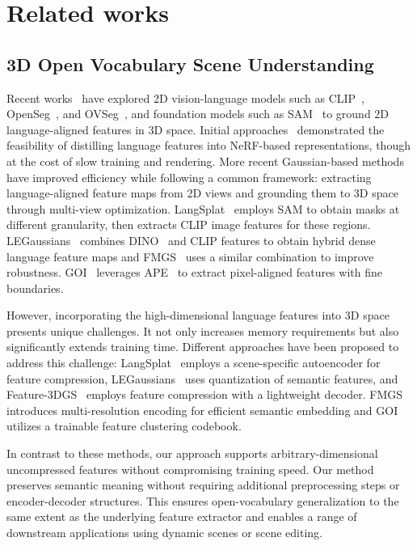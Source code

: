 \section{Related works}
\label{sec:related_works}

\subsection*{3D Open Vocabulary Scene Understanding} Recent works~\cite{zhang2023clip, chen2023clip2scene, peng2023openscene3dsceneunderstanding, tschernezki22neural, goel2023interactive} have explored 2D vision-language models such as CLIP~\cite{Radford2021LearningTV}, OpenSeg~\cite{ghiasi2022scaling}, and OVSeg~\cite{liang2023open}, and foundation models such as SAM~\cite{kirillov2023segment} to ground 2D language-aligned features in 3D space. Initial approaches~\cite{kerr2023lerf, kobayashi2022decomposing, Haque_2023_ICCV} demonstrated the feasibility of distilling language features into NeRF-based representations, though at the cost of slow training and rendering. More recent Gaussian-based methods have improved efficiency while following a common framework: extracting language-aligned feature maps from 2D views and grounding them to 3D space through multi-view optimization. LangSplat~\cite{qin2024langsplat} employs SAM to obtain masks at different granularity, then extracts CLIP image features for these regions. LEGaussians~\cite{shi2024language} combines DINO~\cite{caron2021emerging} and CLIP features to obtain hybrid dense language feature maps and FMGS~\cite{zuo2024fmgs} uses a similar combination to improve robustness. GOI~\cite{qu2024goi3dgaussiansoptimizable} leverages APE~\cite{shen2024aligning} to extract pixel-aligned features with fine boundaries.

However, incorporating the high-dimensional language features into 3D space presents unique challenges. It not only increases memory requirements but also significantly extends training time. Different approaches have been proposed to address this challenge: LangSplat~\cite{qin2024langsplat} employs a scene-specific autoencoder for feature compression, LEGaussians~\cite{shi2024language} uses quantization of semantic features, and Feature-3DGS~\cite{zhou2024feature} employs feature compression with a lightweight decoder. FMGS~\cite{zuo2024fmgs} introduces multi-resolution encoding for efficient semantic embedding and GOI~\cite{qu2024goi3dgaussiansoptimizable} utilizes a trainable feature clustering codebook.

In contrast to these methods, our approach supports arbitrary-dimensional uncompressed features without compromising training speed. Our method preserves semantic meaning without requiring additional preprocessing steps or encoder-decoder structures. This ensures open-vocabulary generalization to the same extent as the underlying feature extractor and enables a range of downstream applications using dynamic scenes or scene editing.


